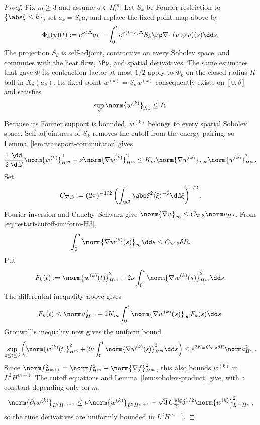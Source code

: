 \begin{proof}
Fix \(m\ge3\) and assume \(a\in H^m_\sigma\).  Let \(S_k\) be Fourier
restriction to \(\{\abs\xi\le k\}\), set \(a_k=S_ka\), and replace the
fixed-point map above by
\[
 \Phi_k(v)(t):=e^{\nu t\Delta}a_k
 -\int_0^te^{\nu(t-s)\Delta}S_k\Pp\nabla\!\cdot
   (v\otimes v)(s)\dd s.
\]
The projection \(S_k\) is self-adjoint, contractive on every Sobolev space,
and commutes with the heat flow, \(\Pp\), and spatial derivatives.  The same
estimates that gave \(\Phi\) its contraction factor at most \(1/2\) apply to
\(\Phi_k\) on the closed radius-\(R\) ball in \(X_\delta(a_k)\).  Its fixed point
\(w^{(k)}=S_kw^{(k)}\) consequently exists on \([0,\delta]\) and satisfies
\begin{equation}
 \sup_k\norm{w^{(k)}}_{X_\delta}\le R.
 \label{eq:restart-cutoff-uniform-H3}
\end{equation}
Because its Fourier support is bounded, \(w^{(k)}\) belongs to every spatial
Sobolev space.  Self-adjointness of \(S_k\) removes the cutoff from the energy
pairing, so Lemma~\ref{lem:transport-commutator} gives
\[
 \frac12\frac{\dd}{\dd t}\norm{w^{(k)}}_{H^m}^2
 +\nu\norm{\nabla w^{(k)}}_{H^m}^2
 \le K_m\norm{\nabla w^{(k)}}_{L^\infty}
       \norm{w^{(k)}}_{H^m}^2.
\]
Set
\[
 C_{\nabla,3}:=(2\pi)^{-3/2}
 \left(\int_{\R^3}\abs\xi^2\langle\xi\rangle^{-6}\dd\xi\right)^{1/2}.
\]
Fourier inversion and Cauchy--Schwarz give
\(\norm{\nabla v}_\infty\le C_{\nabla,3}\norm v_{H^3}\).  From
\eqref{eq:restart-cutoff-uniform-H3},
\[
 \int_0^\delta\norm{\nabla w^{(k)}(s)}_\infty\dd s
 \le C_{\nabla,3}\delta R.
\]
Put
\[
 F_k(t):=\norm{w^{(k)}(t)}_{H^m}^2
 {}+2\nu\int_0^t\norm{\nabla w^{(k)}(s)}_{H^m}^2\dd s.
\]
The differential inequality above gives
\[
 F_k(t)\le\norm a_{H^m}^2
 {}+2K_m\int_0^t\norm{\nabla w^{(k)}(s)}_\infty F_k(s)\dd s.
\]
Gronwall's inequality now gives the uniform bound
\begin{equation}
 \sup_{0\le t\le\delta}\left(
 \norm{w^{(k)}(t)}_{H^m}^2
{}+2\nu\int_0^t\norm{\nabla w^{(k)}(s)}_{H^m}^2\dd s
 \right)
 \le e^{2K_mC_{\nabla,3}\delta R}\norm a_{H^m}^2.
 \label{eq:restart-cutoff-uniform-Hm}
\end{equation}
Since
\(
 \norm f_{H^{m+1}}^2=\norm f_{H^m}^2+\norm{\nabla f}_{H^m}^2
\), this also bounds \(w^{(k)}\) in \(L^2H^{m+1}\).  The cutoff equations
and Lemma~\ref{lem:sobolev-product} give, with a constant depending only on
\(m\),
\[
 \norm{\partial_tw^{(k)}}_{L^2H^{m-1}}
 \le \nu\norm{w^{(k)}}_{L^2H^{m+1}}
 +\sqrt3\,C_m^{\rm alg}\delta^{1/2}
   \norm{w^{(k)}}_{L^\infty H^m}^2,
\]
so the time derivatives are uniformly bounded in \(L^2H^{m-1}\).


\end{proof}
